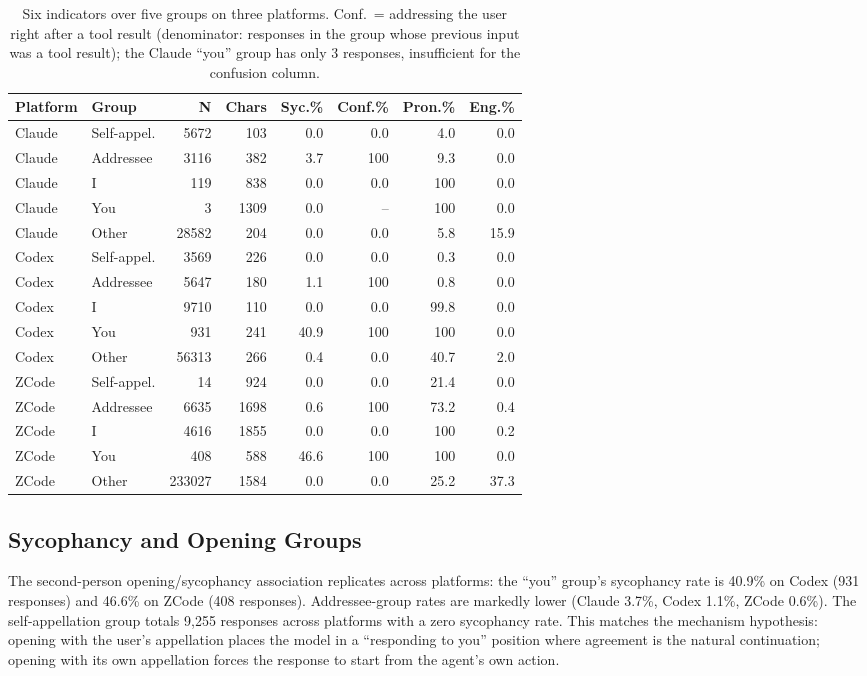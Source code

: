 \documentclass[10pt,twocolumn]{article}
\begin{document}
\begin{table}[t]
\centering
\small
\setlength{\tabcolsep}{3.5pt}
\begin{tabular}{llrrrrrr}
\toprule
Platform & Group & N & Chars & Syc.\% & Conf.\% & Pron.\% & Eng.\% \\
\midrule
Claude & Self-appel. & 5672 & 103 & 0.0 & 0.0 & 4.0 & 0.0 \\
Claude & Addressee & 3116 & 382 & 3.7 & 100 & 9.3 & 0.0 \\
Claude & I & 119 & 838 & 0.0 & 0.0 & 100 & 0.0 \\
Claude & You & 3 & 1309 & 0.0 & -- & 100 & 0.0 \\
Claude & Other & 28582 & 204 & 0.0 & 0.0 & 5.8 & 15.9 \\
\midrule
Codex & Self-appel. & 3569 & 226 & 0.0 & 0.0 & 0.3 & 0.0 \\
Codex & Addressee & 5647 & 180 & 1.1 & 100 & 0.8 & 0.0 \\
Codex & I & 9710 & 110 & 0.0 & 0.0 & 99.8 & 0.0 \\
Codex & You & 931 & 241 & 40.9 & 100 & 100 & 0.0 \\
Codex & Other & 56313 & 266 & 0.4 & 0.0 & 40.7 & 2.0 \\
\midrule
ZCode & Self-appel. & 14 & 924 & 0.0 & 0.0 & 21.4 & 0.0 \\
ZCode & Addressee & 6635 & 1698 & 0.6 & 100 & 73.2 & 0.4 \\
ZCode & I & 4616 & 1855 & 0.0 & 0.0 & 100 & 0.2 \\
ZCode & You & 408 & 588 & 46.6 & 100 & 100 & 0.0 \\
ZCode & Other & 233027 & 1584 & 0.0 & 0.0 & 25.2 & 37.3 \\
\bottomrule
\end{tabular}
\caption{Six indicators over five groups on three platforms. Conf.\ = addressing the
user right after a tool result (denominator: responses in the group whose previous input
was a tool result); the Claude ``you'' group has only 3 responses, insufficient for the
confusion column.}
\label{tab:main}
\end{table}

\subsection{Sycophancy and Opening Groups}
The second-person opening/sycophancy association replicates across platforms: the
``you'' group's sycophancy rate is 40.9\% on Codex (931 responses) and 46.6\% on ZCode
(408 responses). Addressee-group rates are markedly lower (Claude 3.7\%, Codex 1.1\%,
ZCode 0.6\%). The self-appellation group totals 9{,}255 responses across platforms with
a zero sycophancy rate. This matches the mechanism hypothesis: opening with the user's
appellation places the model in a ``responding to you'' position where agreement is the
natural continuation; opening with its own appellation forces the response to start
from the agent's own action.
\end{document}
